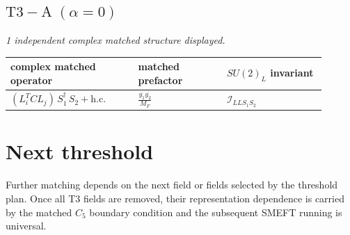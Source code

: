 \documentclass[9pt]{article}
\begin{document}
\subsection*{$ \mathrm{T3-A}\;(\alpha=0) $}
\textit{1 independent complex matched structure displayed. }
\begin{longtable}{@{}p{0.36\linewidth}p{0.25\linewidth}p{0.29\linewidth}@{}}
\toprule
complex matched operator & matched prefactor & $SU(2)_L$ invariant \\
\midrule
$ (L_i^T C L_j)\,S_1^\dagger\,S_2+\mathrm{h.c.} $ & $ \frac{\overline{y_{1}} \overline{y_{2}}}{M_F} $ & $ \mathcal{I}_{LLS_1S_2} $ \\
\bottomrule
\end{longtable}
\section*{Next threshold}
Further matching depends on the next field or fields selected by the threshold plan.  Once all T3 fields are removed, their representation dependence is carried by the matched $C_5$ boundary condition and the subsequent SMEFT running is universal.
\end{document}

